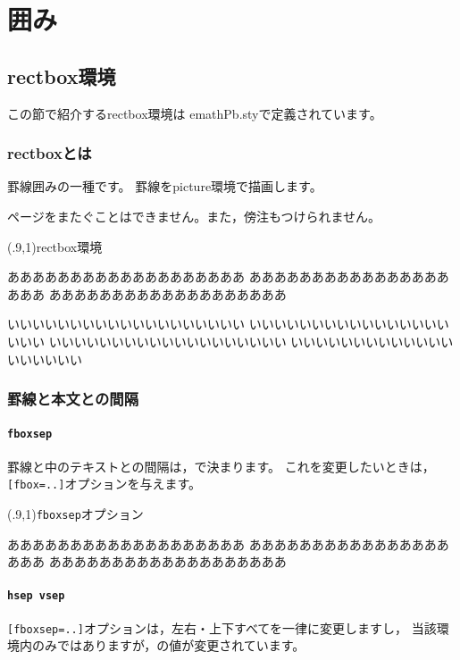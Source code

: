 \section{囲み}
\subsection{\textsf{rectbox}環境}
この節で紹介する\textsf{rectbox}環境は
\textsf{emathPb.sty}で定義されています。

\subsubsection{\textsf{rectbox}とは}
罫線囲みの一種です。
罫線を\textsf{picture}環境で描画します。

ページをまたぐことはできません。また，傍注もつけられません。

\begin{showEx}(.9,1){\textsf{rectbox}環境}
\begin{rectbox}
あああああああああああああああああああ
あああああああああああああああああああ
あああああああああああああああああああ

いいいいいいいいいいいいいいいいいいい
いいいいいいいいいいいいいいいいいいい
いいいいいいいいいいいいいいいいいいい
いいいいいいいいいいいいいいいいいいい
\end{rectbox}
\end{showEx}

\subsubsection{罫線と本文との間隔}
\paragraph{\texttt{fboxsep}}
罫線と中のテキストとの間隔は，で決まります。
これを変更したいときは，\verb+[fbox=..]+オプションを与えます。

\begin{showEx}(.9,1){\texttt{fboxsep}オプション}
\begin{rectbox}[fboxsep=1\zw]
あああああああああああああああああああ
あああああああああああああああああああ
あああああああああああああああああああ
\end{rectbox}
\end{showEx}

\paragraph{\texttt{hsep vsep}}
\verb+[fboxsep=..]+オプションは，左右・上下すべてを一律に変更しますし，
当該環境内のみではありますが，の値が変更されています。

